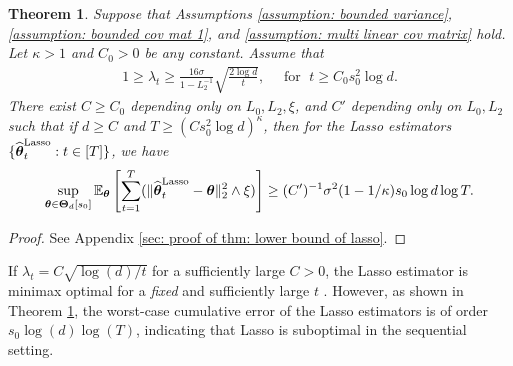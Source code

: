 \documentclass[aos,preprint]{imsart}
\theoremstyle{plain}
\newtheorem{theorem}{Theorem}
\theoremstyle{definition}
\newcommand{\bTheta}{\boldsymbol{\Theta}}
\newcommand{\btheta}{\boldsymbol{\theta}}
\newcommand{\hbtheta}{\widehat{\boldsymbol{\theta}}}
\newcommand{\ltheta}{\hbtheta^{\textup{Lasso}}}
\newcommand{\Exp}{\mathbb{E}}
\begin{document}
\begin{theorem}\label{thm: lower bound of lasso}
Suppose that Assumptions  \ref{assumption: bounded variance},  \ref{assumption: bounded cov mat 1}, and  \ref{assumption: multi linear cov matrix} hold. 
Let $\kappa >1$ and $C_0 > 0$ be any constant. Assume that 
\begin{align*}
   1 \geq  \lambda_t \geq \frac{16\sigma}{1 - L_2^{-1}} \sqrt{\frac{2\log d}{t}},\quad \text{ for } \; t \geq C_0 s_0^2 \log d.
\end{align*}
There exist $C \geq C_0$ depending only on $L_0, L_2, \xi$, and $C'$ depending only on $L_0, L_2$ such that if 
$d \geq C$ and $T \geq \left(C s_0^2 \log d \right)^{\kappa}$, 
then for the Lasso estimators $\{\ltheta_t: t\in[T]\}$, we have
$$\sup_{\btheta\in \bTheta_d[s_0]} \Exp_{\btheta} \left[\sum_{t=1}^T (\|\ltheta_t-\btheta \|_2^2 \wedge \xi) \right] \ge (C')^{-1} \sigma^2 (1-1/\kappa) s_0\log d\log T.$$
\end{theorem}
\begin{proof}
    See Appendix \ref{sec: proof of thm: lower bound of lasso}. 
\end{proof}

If $\lambda_t = C \sqrt{\log(d)/t}$ for a sufficiently large $C > 0$, the Lasso estimator is minimax optimal for a \textit{fixed} and sufficiently large $t$ \cite{wainwright2019high}. However, as shown in Theorem \ref{thm: lower bound of lasso}, the worst-case cumulative error of the Lasso estimators is of order $s_0\log(d)\log(T)$, indicating that Lasso is suboptimal in the sequential setting.


\end{document}
